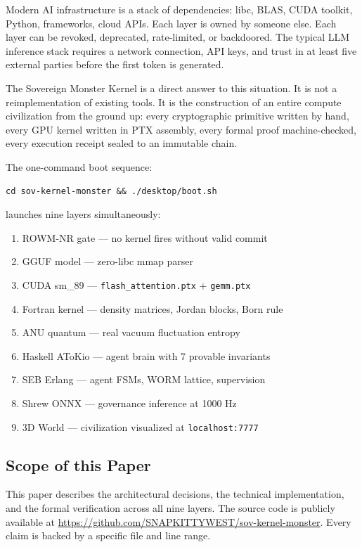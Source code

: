 \documentclass[11pt,a4paper]{article}
\begin{document}
Modern AI infrastructure is a stack of dependencies: libc, BLAS, CUDA
toolkit, Python, frameworks, cloud APIs. Each layer is owned by someone
else. Each layer can be revoked, deprecated, rate-limited, or backdoored.
The typical LLM inference stack requires a network connection, API keys,
and trust in at least five external parties before the first token is
generated.

The Sovereign Monster Kernel is a direct answer to this situation. It is
not a reimplementation of existing tools. It is the construction of an
entire compute civilization from the ground up: every cryptographic
primitive written by hand, every GPU kernel written in PTX assembly, every
formal proof machine-checked, every execution receipt sealed to an
immutable chain.

The one-command boot sequence:

\begin{lstlisting}
cd sov-kernel-monster && ./desktop/boot.sh
\end{lstlisting}

launches nine layers simultaneously:
\begin{enumerate}[noitemsep]
\item ROWM-NR gate --- no kernel fires without valid commit
\item GGUF model --- zero-libc mmap parser
\item CUDA sm\_89 --- \texttt{flash\_attention.ptx} + \texttt{gemm.ptx}
\item Fortran kernel --- density matrices, Jordan blocks, Born rule
\item ANU quantum --- real vacuum fluctuation entropy
\item Haskell AToKio --- agent brain with 7 provable invariants
\item SEB Erlang --- agent FSMs, WORM lattice, supervision
\item Shrew ONNX --- governance inference at 1000 Hz
\item 3D World --- civilization visualized at \texttt{localhost:7777}
\end{enumerate}

\subsection{Scope of this Paper}

This paper describes the architectural decisions, the technical
implementation, and the formal verification across all nine layers. The
source code is publicly available at
\url{https://github.com/SNAPKITTYWEST/sov-kernel-monster}. Every claim is
backed by a specific file and line range.
\end{document}
